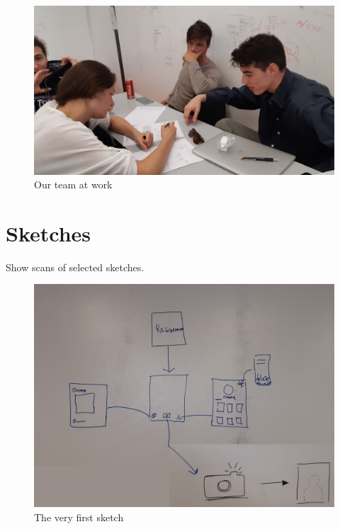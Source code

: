 \documentclass[12pt]{scrartcl}
\begin{document}
	\begin{figure}[H]
        		\centering
       		\includegraphics[width=\textwidth]{../images/group2.jpg}
       		\caption{Our team at work}
        		\label{group2}
	\end{figure}
	
	
\section{Sketches}
	
	Show scans of selected sketches.
	
	\begin{figure}[H]
        		\centering
       		\includegraphics[width=\textwidth]{../images/design1.jpg}
       		\caption{The very first sketch}
        		\label{sketch1}
	\end{figure}
	
\end{document}
